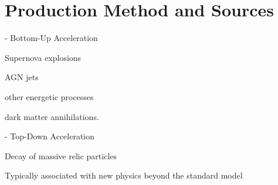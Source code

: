 \section{Production Method and Sources}

- Bottom-Up Acceleration 

Supernova explosions 

AGN jets

other energetic processes

dark matter annihilations.

- Top-Down Acceleration

Decay of massive relic particles

Typically associated with new physics beyond the standard model